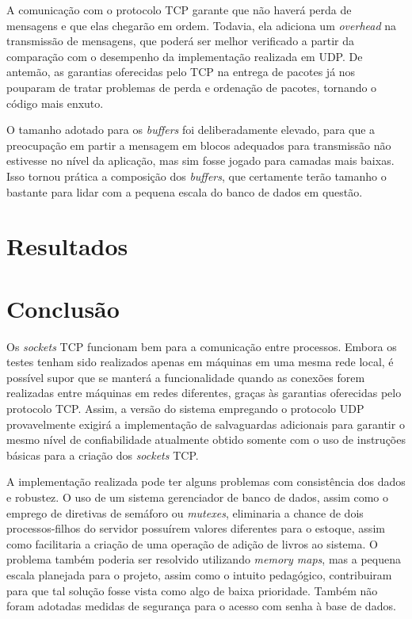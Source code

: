 \documentclass[11pt, brazil]{article} %
\begin{document}
A comunicação com o protocolo TCP garante que não haverá perda de mensagens e que elas chegarão em ordem. 
Todavia, ela adiciona um \emph{overhead} na transmissão de mensagens, que poderá ser melhor verificado a partir da comparação com o desempenho da implementação realizada em UDP. 
De antemão, as garantias oferecidas pelo TCP na entrega de pacotes já nos pouparam de tratar problemas de perda e ordenação de pacotes, tornando o código mais enxuto.

O tamanho adotado para os \emph{buffers} foi deliberadamente elevado, para que a preocupação em partir a mensagem em blocos adequados para transmissão não estivesse no nível da aplicação, mas sim fosse jogado para camadas mais baixas. Isso tornou prática a composição dos \emph{buffers}, que certamente terão tamanho o bastante para lidar com a pequena escala do banco de dados em questão.

\section{Resultados}

\section{Conclusão}

Os \emph{sockets} TCP funcionam bem para a comunicação entre processos. Embora os testes tenham sido realizados apenas em máquinas em uma mesma rede local, é possível supor que se manterá a funcionalidade quando as conexões forem realizadas entre máquinas em redes diferentes, graças às garantias oferecidas pelo protocolo TCP. Assim, a versão do sistema empregando o protocolo UDP provavelmente exigirá a implementação de salvaguardas adicionais para garantir o mesmo nível de confiabilidade atualmente obtido somente com o uso de instruções básicas para a criação dos \emph{sockets} TCP.

A implementação realizada pode ter alguns problemas com consistência dos dados e robustez. O uso de um sistema gerenciador de banco de dados, assim como o emprego de diretivas de semáforo ou \emph{mutexes}, eliminaria a chance de dois processos-filhos do servidor possuírem valores diferentes para o estoque, assim como facilitaria a criação de uma operação de adição de livros ao sistema. O problema também poderia ser resolvido utilizando \emph{memory maps}, mas a pequena escala planejada para o projeto, assim como o intuito pedagógico, contribuiram para que tal solução fosse vista como algo de baixa prioridade. Também não foram adotadas medidas de segurança para o acesso com senha à base de dados.
\end{document}
